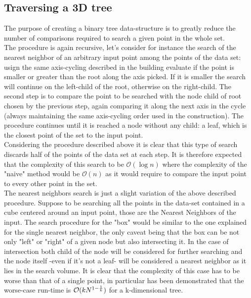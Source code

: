 \subsection{Traversing a 3D tree}
The purpose of creating a binary tree data-structure is to greatly reduce the number of comparisons required to search a given point in the whole set.\\
The procedure is again recursive, let's consider for instance the search of the nearest neighbor of an arbitrary input point among the points of the data set: usign the same axis-cycling described in the building evaluate if the point is smaller or greater than the root along the axis picked. If it is smaller the search will continue on the left-child of the root, otherwise on the right-child. The second step is to compare the point to be searched with the node child of root chosen by the previous step, again comparing it along the next axis in the cycle (always maintaining the same axis-cycling order used in the construction). The procedure continues until it is reached a node without any child: a leaf, which is the closest point of the set to the input point.\\
Considering the procedure described above it is clear that this type of search discards half of the points of the data set at each step. It is therefore expected that the complexity of this search to be $\mathcal{O}(\log{} n)$ where the complexity of the "naive" method would be $\mathcal{O}(n)$ as it would require to compare the input point to every other point in the set.\\
The nearest neighbors search is just a slight variation of the above described procedure. Suppose to be searching all the points in the data-set contained in a cube centered around an input point, those are the Nearest Neighbors of the input. The search procedure for the "box" would be similar to the one explained for the single nearest neighbor, the only caveat being that the box can be not only "left" or "right" of a given node but also intersecting it. In the case of intersection both child of the node will be considered for further searching and the node itself -even if it's not a leaf- will be considered a nearest neighbor as it lies in the search volume. It is clear that the complexity of this case has to be worse than that of a single point, in particular has been demonstrated \cite{worst-case-search} that the worse-case run-time is $\mathcal{O}(k N ^{1 - {1\over k}})$ for a k-dimensional tree.

